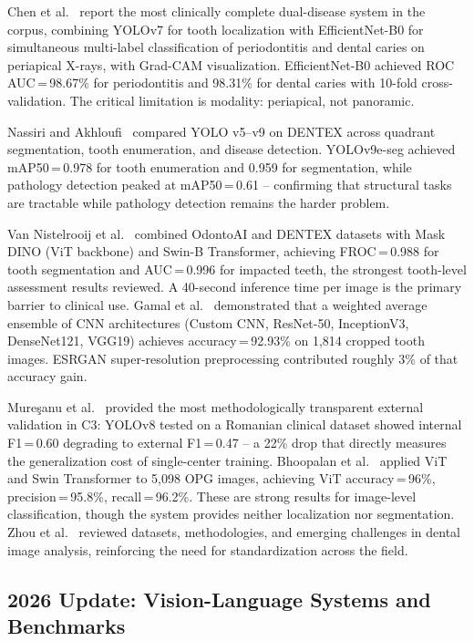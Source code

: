 \documentclass[conference]{IEEEtran}
\begin{document}
Chen et al.~\cite{chen2023deep} report the most clinically complete
dual-disease system in the corpus, combining YOLOv7 for tooth
localization with EfficientNet-B0 for simultaneous multi-label
classification of periodontitis and dental caries on periapical X-rays,
with Grad-CAM visualization. EfficientNet-B0 achieved ROC AUC\,=\,98.67\% for
periodontitis and 98.31\% for dental caries with 10-fold
cross-validation. The critical limitation is modality: periapical, not
panoramic.

Nassiri and Akhloufi~\cite{nassiri2025yolo} compared YOLO
v5--v9 on DENTEX across quadrant segmentation, tooth enumeration, and
disease detection. YOLOv9e-seg achieved mAP50\,=\,0.978 for tooth
enumeration and 0.959 for segmentation, while pathology detection peaked
at mAP50\,=\,0.61 -- confirming that structural tasks are tractable
while pathology detection remains the harder problem.

Van Nistelrooij et al.~\cite{vannistelrooij2024combining} combined
OdontoAI and DENTEX datasets with Mask DINO (ViT backbone) and Swin-B
Transformer, achieving FROC\,=\,0.988 for tooth segmentation and
AUC\,=\,0.996 for impacted teeth, the strongest tooth-level assessment
results reviewed. A 40-second inference time per image is the primary
barrier to clinical use. Gamal et
al.~\cite{gamal2025automated} demonstrated that a weighted average
ensemble of CNN architectures (Custom CNN, ResNet-50, InceptionV3,
DenseNet121, VGG19) achieves accuracy\,=\,92.93\% on 1,814 cropped
tooth images. ESRGAN super-resolution preprocessing contributed roughly
3\% of that accuracy gain.

Mure\c{s}anu et al.~\cite{muresanu2024automating} provided the most
methodologically transparent external validation in C3: YOLOv8 tested
on a Romanian clinical dataset showed internal F1\,=\,0.60 degrading to
external F1\,=\,0.47 -- a 22\% drop that directly measures the
generalization cost of single-center training.
Bhoopalan et al.~\cite{bhoopalan2026self} applied ViT and
Swin Transformer to 5,098 OPG images, achieving ViT accuracy\,=\,96\%,
precision\,=\,95.8\%, recall\,=\,96.2\%. These are strong results for
image-level classification, though the system provides neither
localization nor segmentation. Zhou et al.~\cite{zhou2025deep} reviewed
datasets, methodologies, and emerging challenges in dental
image analysis, reinforcing the need for standardization across the
field.

\subsection{2026 Update: Vision-Language Systems and Benchmarks}
\end{document}
